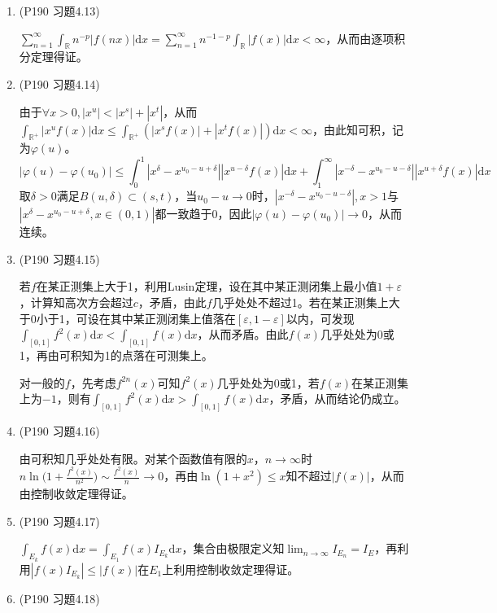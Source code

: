 \documentclass[a4paper,UTF8,fontset=windows]{ctexart}
\begin{document}
\begin{enumerate}
    \item (P190 习题4.13)
    
    $\sum_{n=1}^\infty\int_\mathbb{R}n^{-p}|f(nx)|\mathrm{d}x=\sum_{n=1}^\infty n^{-1-p}\int_\mathbb{R}|f(x)|\mathrm{d}x<\infty$，从而由逐项积分定理得证。
    
    \item (P190 习题4.14)
    
    由于$\forall x>0,|x^u|<|x^s|+|x^t|$，从而$\int_{\mathbb{R}^+}|x^uf(x)|\mathrm{d}x\le\int_{\mathbb{R}^+}(|x^sf(x)|+|x^tf(x)|)\mathrm{d}x<\infty$，由此知可积，记为$\varphi(u)$。
    \[|\varphi(u)-\varphi(u_0)|\le\int_0^1|x^\delta-x^{u_0-u+\delta}||x^{u-\delta}f(x)|\mathrm{d}x+\int_1^\infty|x^{-\delta}-x^{u_0-u-\delta}||x^{u+\delta}f(x)|\mathrm{d}x\]
    取$\delta>0$满足$B(u,\delta)\subset(s,t)$，当$u_0-u\to0$时，$|x^{-\delta}-x^{u_0-u-\delta}|,x>1$与$|x^\delta-x^{u_0-u+\delta},x\in(0,1)|$都一致趋于0，因此$|\varphi(u)-\varphi(u_0)|\to0$，从而连续。
    
    \item (P190 习题4.15)
    
    若$f$在某正测集上大于1，利用Lusin定理，设在其中某正测闭集上最小值$1+\varepsilon$，计算知高次方会超过$c$，矛盾，由此$f$几乎处处不超过1。若在某正测集上大于0小于1，可设在其中某正测闭集上值落在$[\varepsilon,1-\varepsilon]$以内，可发现$\int_{[0,1]}f^2(x)\mathrm{d}x<\int_{[0,1]}f(x)\mathrm{d}x$，从而矛盾。由此$f(x)$几乎处处为0或1，再由可积知为1的点落在可测集上。
    
    对一般的$f$，先考虑$f^{2n}(x)$可知$f^2(x)$几乎处处为0或1，若$f(x)$在某正测集上为$-1$，则有$\int_{[0,1]}f^2(x)\mathrm{d}x>\int_{[0,1]}f(x)\mathrm{d}x$，矛盾，从而结论仍成立。
    
    \item (P190 习题4.16)
    
    由可积知几乎处处有限。对某个函数值有限的$x$，$n\to\infty$时$n\ln\big(1+\frac{f^2(x)}{n^2}\big)\sim\frac{f^2(x)}{n}\to0$，再由$\ln(1+x^2)\le x$知不超过$|f(x)|$，从而由控制收敛定理得证。
    
    \item (P190 习题4.17)
    
    $\int_{E_k}f(x)\mathrm{d}x=\int_{E_1}f(x)I_{E_k}\mathrm{d}x$，集合由极限定义知$\lim_{n\to\infty}I_{E_n}=I_E$，再利用$|f(x)I_{E_k}|\le|f(x)|$在$E_1$上利用控制收敛定理得证。
    
    \item (P190 习题4.18)
    

\end{enumerate}
\end{document}
